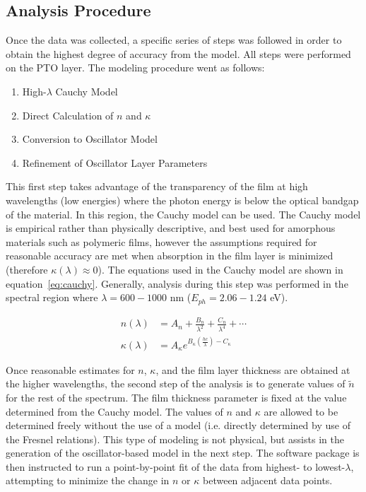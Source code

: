 
\subsection{Analysis Procedure}

Once the data was collected, a specific series of steps was followed in order to obtain the highest degree of accuracy from the model. All steps were performed on the PTO layer. The modeling procedure went as follows:

\begin{enumerate}
\item
High-$\lambda$ Cauchy Model
\item
Direct Calculation of $n$ and $\kappa$
\item
Conversion to Oscillator Model
\item
Refinement of Oscillator Layer Parameters
\end{enumerate}

This first step takes advantage of the transparency of the film at high wavelengths (low energies) where the photon energy is below the optical bandgap of the material. In this region, the Cauchy model can be used. The Cauchy model is empirical rather than physically descriptive, and best used for amorphous materials such as polymeric films, however the assumptions required for reasonable accuracy are met when absorption in the film layer is minimized (therefore $\kappa(\lambda)\approx0$). The equations used in the Cauchy model are shown in equation~\vref{eq:cauchy}. Generally, analysis during this step was performed in the spectral region where $\lambda = 600-1000$ nm ($E_{ph} = 2.06-1.24$ eV). 

\begin{subequations}
\label{eq:cauchy}
\begin{align}
	n\left(\lambda\right) &= A_{n} + \frac{B_{n}}{\lambda^{2}}+\frac{C_{n}}{\lambda^{4}}+\cdots\\
        	\kappa\left(\lambda\right) &= A_{\kappa}e^{B_{\kappa}\left(\frac{hc}{\lambda}\right)-C_{\kappa}}
\end{align}
\end{subequations}

Once reasonable estimates for $n$, $\kappa$, and the film layer thickness are obtained at the higher wavelengths, the second step of the analysis is to generate values of $\tilde{n}$ for the rest of the spectrum. The film thickness parameter is fixed at the value determined from the Cauchy model. The values of $n$ and $\kappa$ are allowed to be determined freely without the use of a model (i.e. directly determined by use of the Fresnel relations). This type of modeling is not physical, but assists in the generation of the oscillator-based model in the next step. The software package is then instructed to run a point-by-point fit of the data from highest- to lowest-$\lambda$, attempting to minimize the change in $n$ or $\kappa$ between adjacent data points. 

